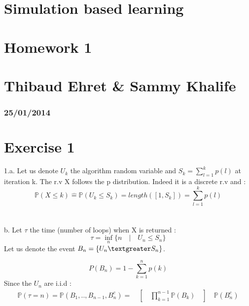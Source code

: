 
\geometry{hmargin=2.5cm,vmargin=2cm}   


\section*{Simulation based learning}
\section*{Homework 1}
\section*{Thibaud Ehret \& Sammy Khalife}
\subsubsection*{25/01/2014}

\section*{Exercise 1}
1.a. Let us denote $U_{k}$ the algorithm random variable and $S_{k}=\sum_{l=1}^{k}p(l)$ at iteration k. The r.v X follows the p distribution. Indeed it is a discrete r.v and : 
$$\mathbb{P}(X \leq k)\hat{=}\mathbb{P}(U_{k} \leq S_{k})=length([1,S_{k}])=\sum_{l=1}^{k}p(l)$$~\\
~\\
b. Let $\tau$ the time (number of loops) when X is returned :
$$\tau=\inf_{n}\{n \quad | \quad U_{n} \leq S_{n}\}$$
Let us denote the event $B_{n}=\{U_{n} \textgreater S_{n}\}$.

$$P(B_{n})=1-\sum_{k=1}^{n}p(k)$$
Since the $U_{n}$ are i.i.d :
\begin{eqnarray*}
\mathbb{P}(\tau=n)=\mathbb{P}(B_{1},.., B_{n-1}, B_{n}^{c})=\quad [\quad \prod_{k=1}^{n-1}\mathbb{P}(B_k) \quad ]\quad \mathbb{P}(B_n^{c})
\end{eqnarray*}

